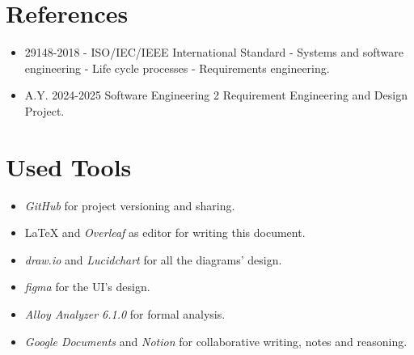 \section{References}
\label{sec:references}%

\begin{itemize}
    \item 29148-2018 - ISO/IEC/IEEE International Standard - Systems and software engineering - Life cycle processes - Requirements engineering.
    \item A.Y. 2024-2025 Software Engineering 2 Requirement Engineering and Design Project.
\end{itemize}

\section{Used Tools}
\label{sec:used_tools}%
\begin{itemize}
    \item \textit{GitHub} for project versioning and sharing.
    \item \LaTeX{} and \textit{Overleaf} as editor for writing this document.
    \item \textit{draw.io} and \textit{Lucidchart} for all the diagrams' design.
    \item \textit{figma} for the UI's design.
    \item \textit{Alloy Analyzer 6.1.0} for formal analysis.
    \item \textit{Google Documents} and \textit{Notion} for collaborative writing, notes and reasoning.
\end{itemize}